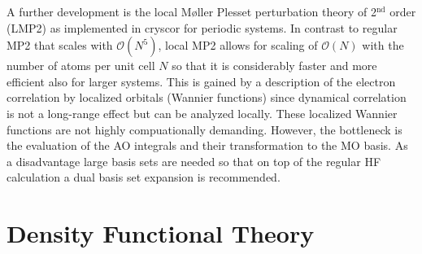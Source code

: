 \documentclass[11pt,DIV=13,BCOR=5mm,a4paper,headinclude]{scrbook}
\begin{document}
A further development is the local M\o{}ller Plesset perturbation theory\cite{usvyat2015,usvyatbook,Maschio2007} of 2$^{\textrm{nd}}$ order (LMP2) as implemented in cryscor\cite{cryscor} for periodic systems.
In contrast to regular MP2 that scales with $\mathcal{O}(N^5)$, local MP2 allows for scaling of $\mathcal{O}(N)$ with the number of atoms per unit cell $N$ so that it is considerably faster and more efficient also for larger systems.
This is gained by a description of the electron correlation by localized orbitals (Wannier functions) since dynamical correlation is not a long-range effect but can be analyzed locally.
These localized Wannier functions are not highly compuationally demanding.
However, the bottleneck is the evaluation of the AO integrals and their transformation to the MO basis.
As a disadvantage large basis sets are needed so that on top of the regular HF calculation a dual basis set expansion is recommended\cite{Usvyat2010}.

\section{Density Functional Theory}
\end{document}
